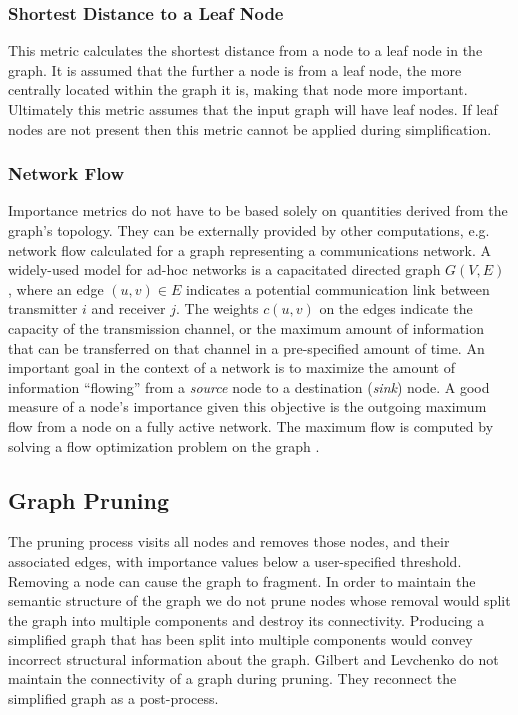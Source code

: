 \subsubsection{Shortest Distance to a Leaf Node}
This metric calculates the shortest distance from a node to a leaf node in the graph.  It is assumed that the further a node is from a leaf node, the more centrally located within the graph it is, making that node more important.  Ultimately this metric assumes that the input graph will have leaf nodes.  If leaf nodes are not present then this metric cannot be applied during simplification.

\subsubsection{Network Flow}
Importance metrics do not have to be based solely on quantities derived from the graph's topology.  They can be externally provided by other computations, e.g. network flow calculated for a graph representing a communications network.  A widely-used model for ad-hoc networks is a capacitated directed graph $G(V,E)$ \cite{AMO:flows}, where an edge $(u,v)\in E$ indicates a potential communication link between transmitter $i$ and receiver $j$. The weights $c(u,v)$ on the edges indicate the capacity of the transmission channel, or the maximum amount of information that can be transferred on that channel in a pre-specified amount of time. An important goal in the context of a network is to maximize the amount of information ``flowing'' from a \textit{source} node to a destination (\textit{sink}) node. A good measure of a node's importance given this objective is the outgoing maximum flow from a node on a fully active network.  The maximum flow is computed by solving a flow optimization problem on the graph \cite{Fridman08}.

\subsection{Graph Pruning}

The pruning process visits all nodes and removes those nodes, and their associated edges, with importance values below a user-specified threshold.  Removing a node can cause the graph to fragment.  In order to maintain the semantic structure of the graph we do not prune nodes whose removal would split the graph into multiple components and destroy its connectivity.  Producing a simplified graph that has been split into multiple components would convey incorrect structural information about the graph.  Gilbert and Levchenko \cite{Gilbert-Levchenko04} do not maintain the connectivity of a graph during pruning.  They reconnect the simplified graph as a post-process.

